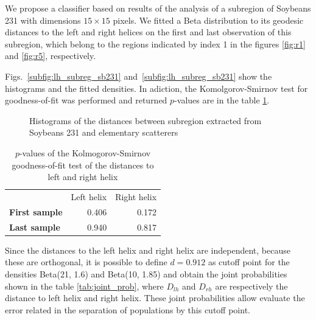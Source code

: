 \documentclass[12pt]{article}
\begin{document}
We propose a classifier based on results of the analysis of a subregion of Soybeans 231 with dimensions $15\times 15$ pixels.
We fitted a Beta distribution to its geodesic distances to the left and right helices on the first and last observation of this subregion, which belong to the regions indicated by index 1 in the figures \ref{fig:r1} and \ref{fig:r5}, respectively.

Figs.~\ref{subfig:lh_subreg_sb231} and~\ref{subfig:lh_subreg_sb231} show the histograms and the fitted densities.
In adiction, the Komolgorov-Smirnov test for goodness-of-fit was performed and returned $p$-values are in the table \ref{tab:pvalues_table_lh_rh}.

\begin{figure}[hbt]
  \caption{Histograms of the distances between subregion extracted from Soybeans 231 and elementary scatterers}
  \label{fig:hist_lh_rh}
\end{figure}

\begin{table}[hbt]
  \centering
  \caption{$p$-values of the Kolmogorov-Smirnov goodness-of-fit test of the distances to left and right helix}\label{tab:pvalues_table_lh_rh}
  \begin{tabular}{lrr}
    \toprule
    & Left helix & Right helix\\
    \cmidrule{2-3}
    \textbf{First sample} & 0.406 & 0.172\\
    \textbf{Last sample} & 0.940 & 0.817\\
    \bottomrule
  \end{tabular}
\end{table}

Since the distances to the left helix and right helix are independent, because these are orthogonal, it is possible to define $d = 0.912$ as cutoff point for the densities Beta(21, 1.6) and Beta(10, 1.85) and obtain the joint probabilities shown in the table \ref{tab:joint_prob}, where $D_{lh}$ and $D_{rh}$ are respectively the distance to left helix and right helix.  These joint probabilities allow evaluate the error related in the separation of populations by this cutoff point.
\end{document}
